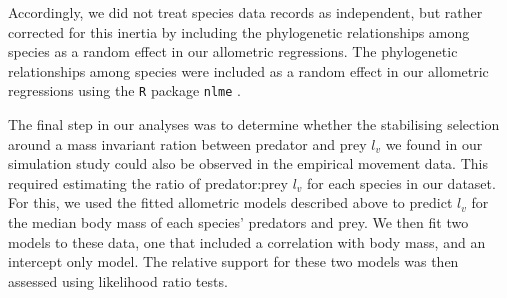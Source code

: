 \documentclass[12pt]{article}
\begin{document}
Accordingly, we did not treat species data records as independent, but rather corrected for this inertia by including the phylogenetic relationships among species as a random effect in our allometric regressions. The phylogenetic relationships among species were included as a random effect in our allometric regressions using the \texttt{R} package \texttt{nlme} \cite{Pinheiro:2018}.



The final step in our analyses was to determine whether the stabilising selection around a mass invariant ration between predator and prey $l_v$ we found in our simulation study could also be observed in the empirical movement data. This required estimating the ratio of predator:prey $l_v$ for each species in our dataset. For this, we used the fitted allometric models described above to predict $l_v$ for the median body mass of each species' predators and prey. We then fit two models to these data, one that included a correlation with body mass, and an intercept only model. The relative support for these two models was then assessed using likelihood ratio tests.

\end{document}
